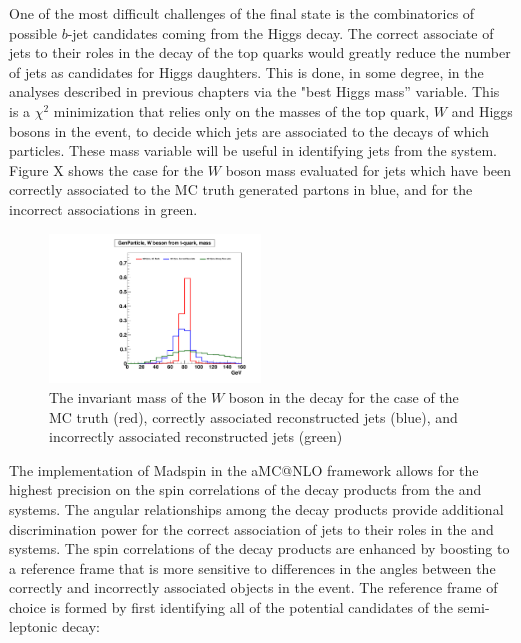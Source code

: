 \par One of the most difficult challenges of the \ttH final state is
the combinatorics of possible $b$-jet candidates coming from the Higgs
decay.  The correct associate of jets to their roles in the decay of
the top quarks would greatly reduce the number of jets as candidates
for Higgs daughters.  This is done, in some degree, in the analyses
described in previous chapters via the "best Higgs mass'' variable.
This is a $\chi^{2}$ minimization that relies only on the masses of
the top quark, $W$ and Higgs bosons in the event, to decide which jets
are associated to the decays of which particles.  These mass variable
will be useful in identifying jets from the \ttbar system.  Figure X shows the
case for the $W$ boson mass evaluated for jets which have been
correctly associated to the MC truth generated partons in blue, and
for the incorrect associations in green.  

\begin{figure}[hbtp] 
  {\centering
    \includegraphics[width=0.50\textwidth]{Figures/Analysis_Improvement_Diagrams/tt012jets__h_genParticle_w_boson_fromTop_mass__vs__h_recoJets_correctAssoc_labFrame_mHadW__vs__h_recoJets_wrongAssoc_labFrame_mHadW__unitNorm.pdf}
    \caption{The invariant mass of the $W$ boson in the \ttbar decay
      for the case of the MC truth (red), correctly associated reconstructed
      jets (blue), and incorrectly associated reconstructed jets (green)}
    \label{fig:aMCatNLO_wMass}}
\end{figure}

\par The implementation of Madspin in the aMC@NLO framework allows for
the highest precision on the spin correlations of the decay
products from the \ttH and \ttbar systems.  The angular relationships
among the decay products provide additional discrimination power for the
correct association of jets to their roles in the \ttH and \ttbar
systems.  The spin correlations of the decay products are enhanced by
boosting to a reference frame that is more sensitive to differences in
the angles between the correctly and incorrectly associated objects in
the event.  The reference frame of choice is formed by first
identifying all of the potential candidates of the semi-leptonic
\ttbar decay:


